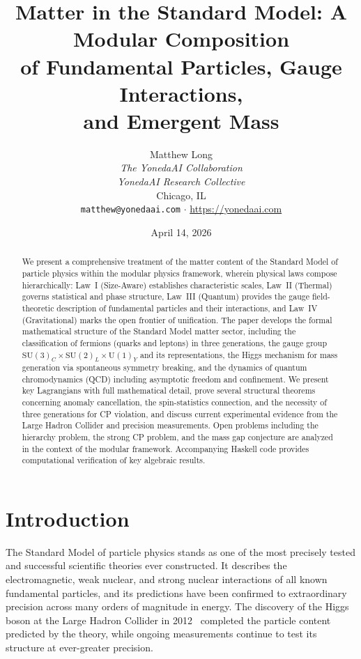 \documentclass[12pt]{article}
\title{\textbf{Matter in the Standard Model: A Modular Composition\\of Fundamental Particles, Gauge Interactions,\\and Emergent Mass}}
\author{Matthew Long \\
\textit{The YonedaAI Collaboration} \\
\textit{YonedaAI Research Collective} \\
Chicago, IL \\
\texttt{matthew@yonedaai.com} $\cdot$ \url{https://yonedaai.com}}
\date{April 14, 2026}
\theoremstyle{definition}
\theoremstyle{remark}
\begin{document}
\maketitle

\begin{abstract}
We present a comprehensive treatment of the matter content of the Standard Model of particle physics within the modular physics framework, wherein physical laws compose hierarchically: Law~I (Size-Aware) establishes characteristic scales, Law~II (Thermal) governs statistical and phase structure, Law~III (Quantum) provides the gauge field-theoretic description of fundamental particles and their interactions, and Law~IV (Gravitational) marks the open frontier of unification. The paper develops the formal mathematical structure of the Standard Model matter sector, including the classification of fermions (quarks and leptons) in three generations, the gauge group $\mathrm{SU}(3)_C \times \mathrm{SU}(2)_L \times \mathrm{U}(1)_Y$ and its representations, the Higgs mechanism for mass generation via spontaneous symmetry breaking, and the dynamics of quantum chromodynamics (QCD) including asymptotic freedom and confinement. We present key Lagrangians with full mathematical detail, prove several structural theorems concerning anomaly cancellation, the spin-statistics connection, and the necessity of three generations for CP violation, and discuss current experimental evidence from the Large Hadron Collider and precision measurements. Open problems including the hierarchy problem, the strong CP problem, and the mass gap conjecture are analyzed in the context of the modular framework. Accompanying Haskell code provides computational verification of key algebraic results.
\end{abstract}

\tableofcontents
\newpage

\section{Introduction}
\label{sec:introduction}

The Standard Model of particle physics stands as one of the most precisely tested and successful scientific theories ever constructed. It describes the electromagnetic, weak nuclear, and strong nuclear interactions of all known fundamental particles, and its predictions have been confirmed to extraordinary precision across many orders of magnitude in energy. The discovery of the Higgs boson at the Large Hadron Collider in 2012~\cite{ATLAS2012,CMS2012} completed the particle content predicted by the theory, while ongoing measurements continue to test its structure at ever-greater precision.
\end{document}
